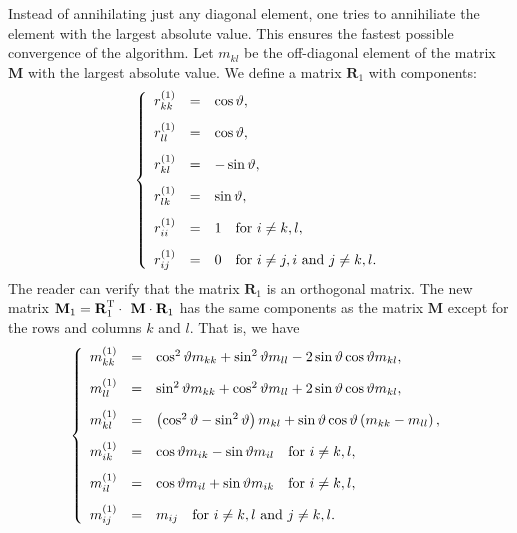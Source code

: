 Instead of annihilating just any diagonal element, one tries to
annihiliate the element with the largest absolute value. This
ensures the fastest possible convergence of the algorithm. Let
$m_{kl}$ be the off-diagonal element of the matrix $\textbf{M}$ with
the largest absolute value. We define a matrix $\textbf{R}_1$ with
components:
\begin{equation}
  \left\{
  \begin{array}{lcl}
    r^{\left(1\right)}_{kk} &=& \cos\vartheta, \\*[2ex]
    r^{\left(1\right)}_{ll} &=& \cos\vartheta, \\*[2ex]
    r^{\left(1\right)}_{kl} &=& -\sin\vartheta, \\*[2ex]
    r^{\left(1\right)}_{lk} &=& \sin\vartheta, \\*[2ex]
    r^{\left(1\right)}_{ii} &=& 1\mbox{\quad for $i\ne k,l$}, \\*[2ex]
    r^{\left(1\right)}_{ij} &=& 0\mbox{\quad for $i\ne j, i$ and $j \ne k,l$.}
  \end{array}
  \right.
\end{equation}
The reader can verify that the matrix $\textbf{R}_1$ is an orthogonal
matrix. The new matrix $\textbf{M}_1=\textbf{R}^{\mathop\textrm{T}}_1\cdot\textbf{
M}\cdot\textbf{R}_1$ has the same components as the matrix $\textbf{M}$
except for the rows and columns $k$ and $l$. That is, we have
\begin{equation}
\label{eq:jacobistep}
  \left\{
  \begin{array}{lcl}
    m^{\left(1\right)}_{kk} &=& \cos^2\vartheta m_{kk}+\sin^2\vartheta m_{ll} - 2\sin\vartheta\cos\vartheta m_{kl}, \\*[2ex]
    m^{\left(1\right)}_{ll} &=& \sin^2\vartheta m_{kk}+\cos^2\vartheta m_{ll} + 2\sin\vartheta\cos\vartheta m_{kl}, \\*[2ex]
    m^{\left(1\right)}_{kl} &=& \left(\cos^2\vartheta-\sin^2\vartheta\right)m_{kl}+\sin\vartheta\cos\vartheta
    \left(m_{kk}-m_{ll}\right), \\*[2ex]
    m^{\left(1\right)}_{ik} &=& \cos\vartheta m_{ik}-\sin\vartheta m_{il}\mbox{\quad for $i\ne k,l$}, \\*[2ex]
    m^{\left(1\right)}_{il} &=& \cos\vartheta m_{il}+\sin\vartheta m_{ik}\mbox{\quad for $i\ne k,l$}, \\*[2ex]
    m^{\left(1\right)}_{ij} &=& m_{ij}\mbox{\quad for $i\ne k,l$ and $j\ne k,l$}.  \end{array}
  \right.
\end{equation}
